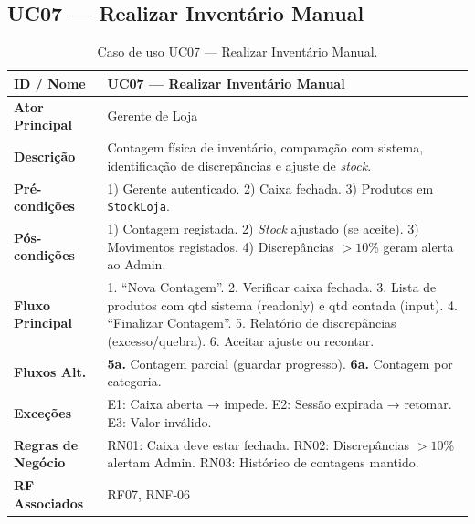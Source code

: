 \documentclass[a4paper,12pt]{scrreprt}
\begin{document}
\subsection*{UC07 --- Realizar Inventário Manual}
\begin{table}[H]
\centering\small
\begin{tabular}{|p{3cm}|p{11cm}|}
\hline
\textbf{ID / Nome} & UC07 --- Realizar Inventário Manual \\
\hline
\textbf{Ator Principal} & Gerente de Loja \\
\hline
\textbf{Descrição} & Contagem física de inventário, comparação com sistema, identificação de discrepâncias e ajuste de \textit{stock}. \\
\hline
\textbf{Pré-condições} & 1) Gerente autenticado. 2) Caixa fechada. 3) Produtos em \texttt{StockLoja}. \\
\hline
\textbf{Pós-condições} & 1) Contagem registada. 2) \textit{Stock} ajustado (se aceite). 3) Movimentos registados. 4) Discrepâncias $> 10$\% geram alerta ao Admin. \\
\hline
\textbf{Fluxo Principal} & 1. ``Nova Contagem''. 2. Verificar caixa fechada. 3. Lista de produtos com qtd sistema (readonly) e qtd contada (input). 4. ``Finalizar Contagem''. 5. Relatório de discrepâncias (excesso/quebra). 6. Aceitar ajuste ou recontar. \\
\hline
\textbf{Fluxos Alt.} & \textbf{5a.} Contagem parcial (guardar progresso). \textbf{6a.} Contagem por categoria. \\
\hline
\textbf{Exceções} & E1: Caixa aberta → impede. E2: Sessão expirada → retomar. E3: Valor inválido. \\
\hline
\textbf{Regras de Negócio} & RN01: Caixa deve estar fechada. RN02: Discrepâncias $> 10$\% alertam Admin. RN03: Histórico de contagens mantido. \\
\hline
\textbf{RF Associados} & RF07, RNF-06 \\
\hline
\end{tabular}
\caption{Caso de uso UC07 --- Realizar Inventário Manual.}
\end{table}

\end{document}
